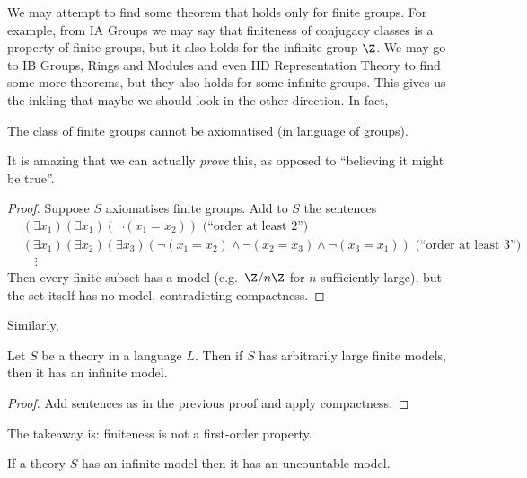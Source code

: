 \documentclass[a4paper]{article}
\begin{document}
We may attempt to find some theorem that holds only for finite groups. For example, from IA Groups we may say that finiteness of conjugacy classes is a property of finite groups, but it also holds for the infinite group \(\Z\). We may go to IB Groups, Rings and Modules and even IID Representation Theory to find some more theorems, but they also holds for some infinite groups. This gives us the inkling that maybe we should look in the other direction. In fact,

\begin{corollary}
  The class of finite groups cannot be axiomatised (in language of groups).
\end{corollary}

\begin{remark}
  It is amazing that we can actually \emph{prove} this, as opposed to ``believing it might be true''.
\end{remark}

\begin{proof}
  Suppose \(S\) axiomatises finite groups. Add to \(S\) the sentences
  \begin{align*}
    & (\exists x_1) (\exists x_1) (\neg(x_1 = x_2)) \text{ (``order at least 2'')} \\
    & (\exists x_1) (\exists x_2) (\exists x_3) (\neg(x_1 = x_2) \land \neg(x_2 = x_3) \land \neg(x_3 = x_1)) \text{ (``order at least 3'')} \\
    & \quad \vdots
  \end{align*}
  Then every finite subset has a model (e.g.\ \(\Z/n\Z\) for \(n\) sufficiently large), but the set itself has no model, contradicting compactness.
\end{proof}

Similarly,

\begin{corollary}
  Let \(S\) be a theory in a language \(L\). Then if \(S\) has arbitrarily large finite models, then it has an infinite model.
\end{corollary}

\begin{proof}
  Add sentences as in the previous proof and apply compactness.
\end{proof}

The takeaway is: finiteness is not a first-order property.

\begin{corollary}
  If a theory \(S\) has an infinite model then it has an uncountable model.
\end{corollary}
\end{document}
